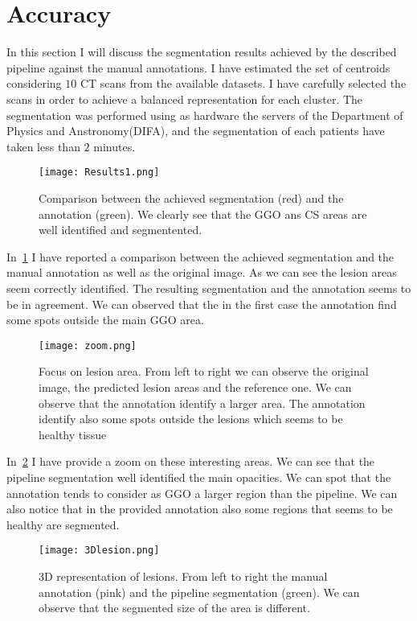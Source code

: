 \documentclass{standalone}
\begin{document}
	\section{Accuracy}
	
	In this section I will discuss the segmentation results achieved by the described pipeline against the manual annotations. I have estimated the set of centroids considering $10$ CT scans from the available datasets. I have carefully selected the scans in order to achieve a balanced representation for each cluster. The segmentation was performed using as hardware the servers of the Department of Physics and Anstronomy(DIFA), and the segmentation of each patients have taken less than $2$ minutes.
	
	\begin{figure}[h!]
		\centering 
		\texttt{[image: Results1.png]}
		\caption{Comparison between the achieved segmentation (red) and the annotation (green). We clearly see that the GGO ans CS areas are well identified and segmentented.}\label{fig:Results}
	\end{figure}



	In \figurename\,\ref{fig:Results} I have reported a comparison between the achieved segmentation and the manual annotation as well as the original image. As we can see the lesion areas seem correctly identified. The resulting segmentation and the annotation seems to be in agreement. We can observed that the in the first case the annotation find some spots outside the main GGO area. 
	
	\begin{figure}[h!]
		\centering
			\texttt{[image: zoom.png]}
		\caption{Focus on lesion area. From left to right we can observe the original image, the predicted lesion areas and the reference one. We can observe that the annotation  identify a larger area. The annotation identify also some spots outside the lesions which seems to be healthy tissue}\label{fig:zoom}
	\end{figure}

	In \figurename\,\ref{fig:zoom} I have provide a zoom on these interesting areas. We can see that the pipeline segmentation well identified the main opacities. We can spot that the  annotation tends to consider as GGO a larger region than the pipeline. We can also notice that in the provided annotation also some regions that seems to be healthy are segmented.
	
		
	\begin{figure}[h!]
		
		\centering 
		\texttt{[image: 3Dlesion.png]}
		\caption{3D representation of lesions. From left to right the manual annotation (pink) and the pipeline segmentation (green). We can observe that the segmented size of the area is different.}\label{fig:3Dlabel}		
	\end{figure}
	
\end{document}
